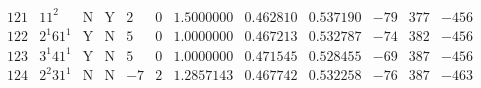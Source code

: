 \documentclass[11pt,reqno,a4letter]{article}
\numberwithin{figure}{section}
\numberwithin{table}{section}
\theoremstyle{plain}
\numberwithin{theorem}{section}
\theoremstyle{definition}
\begin{document}
\begin{table}[h!]
\begin{equation*}
{\begin{array}{cc|cc|ccc|cc|ccc}
 121 & 11^2 & \text{N} & \text{Y} & 2 & 0 & 1.5000000 & 0.462810 & 0.537190 & -79 & 377 & -456 \\
 122 & 2^1 61^1 & \text{Y} & \text{N} & 5 & 0 & 1.0000000 & 0.467213 & 0.532787 & -74 & 382 & -456 \\
 123 & 3^1 41^1 & \text{Y} & \text{N} & 5 & 0 & 1.0000000 & 0.471545 & 0.528455 & -69 & 387 & -456 \\
 124 & 2^2 31^1 & \text{N} & \text{N} & -7 & 2 & 1.2857143 & 0.467742 & 0.532258 & -76 & 387 & -463 \\ 
\end{array}
}
\end{equation*}

\end{table} 


\newpage
\begin{table}[h!]

\centering


\end{table}
\end{document}
